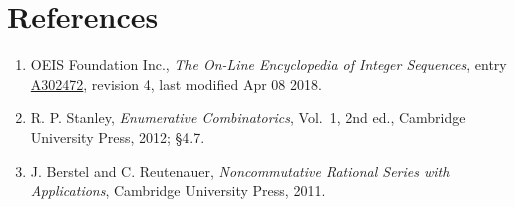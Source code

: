 \documentclass[11pt]{article}
\theoremstyle{definition}
\begin{document}
\section{References}

\begin{enumerate}

\item OEIS Foundation Inc., \emph{The On-Line Encyclopedia of Integer Sequences}, entry \href{https://oeis.org/A302472}{A302472}, revision 4, last modified Apr 08 2018.

\item R. P. Stanley, \emph{Enumerative Combinatorics}, Vol.~1, 2nd ed., Cambridge University Press, 2012; \S4.7.

\item J. Berstel and C. Reutenauer, \emph{Noncommutative Rational Series with Applications}, Cambridge University Press, 2011.

\end{enumerate}
\end{document}
